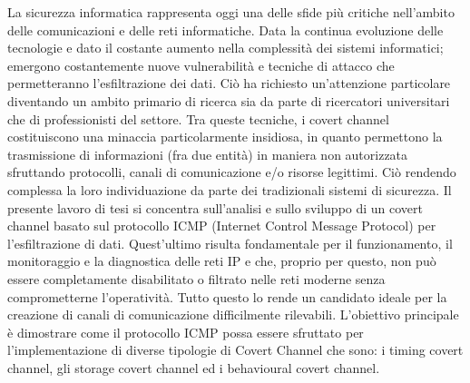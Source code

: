 La sicurezza informatica rappresenta oggi una delle sfide più critiche nell'ambito delle comunicazioni e delle reti informatiche. 
Data la continua evoluzione delle tecnologie e dato il costante aumento nella complessità dei sistemi informatici; emergono costantemente nuove vulnerabilità e tecniche di 
attacco che permetteranno l'esfiltrazione dei dati. Ciò ha richiesto un'attenzione particolare diventando un ambito primario di ricerca sia da parte di ricercatori universitari 
che di professionisti del settore. 
Tra queste tecniche, i covert channel costituiscono una minaccia particolarmente insidiosa, in quanto permettono la trasmissione di informazioni (fra due entità) in maniera 
non autorizzata sfruttando protocolli, canali di comunicazione e/o risorse legittimi. Ciò rendendo complessa la loro individuazione da parte dei tradizionali sistemi di sicurezza.
\vspace{2ex} \newline  
Il presente lavoro di tesi si concentra sull'analisi e sullo sviluppo di un covert channel basato sul protocollo ICMP (Internet Control Message Protocol) per l'esfiltrazione di 
dati. Quest'ultimo risulta fondamentale per il funzionamento, il monitoraggio e la diagnostica delle reti IP e che, proprio per questo, non può essere completamente disabilitato 
o filtrato nelle reti moderne senza comprometterne l'operatività. 
Tutto questo lo rende un candidato ideale per la creazione di canali di comunicazione difficilmente rilevabili.
L'obiettivo principale è dimostrare come il protocollo ICMP possa essere sfruttato per l'implementazione di diverse tipologie di Covert Channel che sono: i timing covert channel, gli  storage covert channel ed i behavioural covert channel.  
